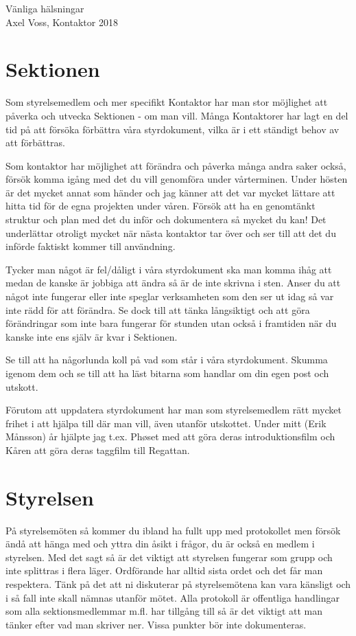 \documentclass[10pt]{article}
\begin{document}
\begin{itshape}
Vänliga hälsningar\\
Axel Voss, Kontaktor 2018\\
\end{itshape}
\newpage

\tableofcontents
\newpage

\section{Sektionen}
Som styrelsemedlem och mer specifikt Kontaktor har man stor möjlighet att påverka och utvecka Sektionen - om man vill. Många Kontaktorer har lagt en del tid på att försöka förbättra våra styrdokument, vilka är i ett ständigt behov av att förbättras.

Som kontaktor har möjlighet att förändra och påverka många andra saker också, försök komma igång med det du vill genomföra under vårterminen. Under hösten är det mycket annat som händer och jag känner att det var mycket lättare att hitta tid för de egna projekten under våren. Försök att ha en genomtänkt struktur och plan med det du inför och dokumentera så mycket du kan! Det underlättar otroligt mycket när nästa kontaktor tar över och ser till att det du införde faktiskt kommer till användning.   

Tycker man något är fel/dåligt i våra styrdokument ska man komma ihåg att medan de kanske är jobbiga att ändra så är de inte skrivna i sten. Anser du att något inte fungerar eller inte speglar verksamheten som den ser ut idag så var inte rädd för att förändra. Se dock till att tänka långsiktigt och att göra förändringar som inte bara fungerar för stunden utan också i framtiden när du kanske inte ens själv är kvar i Sektionen.

Se till att ha någorlunda koll på vad som står i våra styrdokument. Skumma igenom dem och se till att ha läst bitarna som handlar om din egen post och utskott.

Förutom att uppdatera styrdokument har man som styrelsemedlem rätt mycket frihet i att hjälpa till där man vill, även utanför utskottet. Under mitt (Erik Månsson) år hjälpte jag t.ex. Ph\o set med att göra deras introduktionsfilm och Kåren att göra deras taggfilm till Regattan.

\section{Styrelsen}
På styrelsemöten så kommer du ibland ha fullt upp med protokollet men försök ändå att hänga med och yttra din åsikt i frågor, du är också en medlem i styrelsen. Med det sagt så är det viktigt att styrelsen fungerar som grupp och inte splittras i flera läger. Ordförande har alltid sista ordet och det får man respektera. Tänk på det att ni diskuterar på styrelsemötena kan vara känsligt och i så fall inte skall nämnas utanför mötet. Alla protokoll är offentliga handlingar som alla sektionsmedlemmar m.fl. har tillgång till så är det viktigt att man tänker efter vad man skriver ner. Vissa punkter bör inte dokumenteras.
\end{document}
